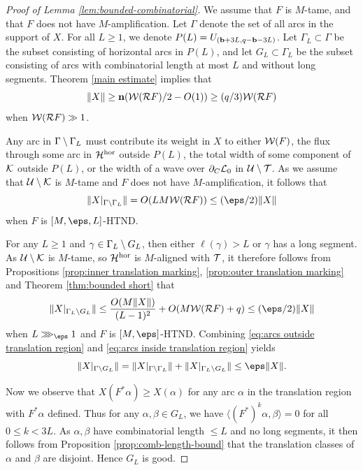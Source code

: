 \documentclass[12pt]{amsart}
\begin{document}
\begin{proof}[Proof of Lemma \ref{lem:bounded-combinatorial}]
	We assume that $F$ is $M$-tame, and that $F$ does not have $M$-amplification.	
	Let $\Gamma$ denote the set of all arcs in the support of $X$. For all $L\geq 1$, we denote $P(L)= U_{(\mathbf b+3L, q-\mathbf b-3L)}$. Let $\Gamma_L\subset \Gamma$ be the subset consisting of horizontal arcs in $P(L)$, and let  $G_L\subset \Gamma_L$ be the subset consisting of arcs with combinatorial length at most $L$
	and without long segments. Theorem \ref{main estimate} implies that 
	$$\|X\|\geq \mathbf{n} (\mathcal W(\mathcal R F)/2-O(1))\geq (q/3)\mathcal W(\mathcal R F)$$
	when $\mathcal W(\mathcal R F)\gg 1$.
	
	
	Any arc in $\Gamma\setminus \Gamma_L$ must contribute its weight in $X$ to either $\mathcal W(F)$, the flux through some arc in  $\mathcal H^{\mathrm{hor}}$ outside $P(L)$, the total width of some component of $\mathcal K$ outside $P(L)$, or the width of a wave over $\partial_C\mathcal L_0$ in $\mathcal U\setminus \mathcal T$. As we assume that $\mathcal U\setminus \mathcal K$ is $M$-tame and $F$ does not have $M$-amplification, it follows that
	\begin{equation}\label{eq:arcs outside translation region}
		\|X|_{\Gamma\sm \Gamma_L}\|  = 
		O(L M \WW(\RR F))\leq (\eps/2)\|X\|
	\end{equation}
	when $F$ is $[M, \eps, L]$-HTND.
	
	
	For any $L\geq 1$ and $\gamma\in \Gamma_L\setminus G_L$, 
	then either $\ell(\gamma)> L$ or $\gamma$ has a long segment. 
	As $\mathcal U\setminus \mathcal K$ is $M$-tame, so $\mathcal H^{\mathrm{hor}}$ is $M$-aligned with $\mathcal T$, it therefore follows from 
	Propositions \ref{prop:inner translation marking}, \ref{prop:outer translation marking} and Theorem \ref{thm:bounded short} 
	that 
	\begin{equation}\label{eq:arcs inside translation region}
		\|X|_{\Gamma_L\sm G_L}\|\leq \frac{O(M\|X\|)}{(L-1)^2}+ O(M\WW(\RR F)+q)\leq (\eps/2)\|X\|
	\end{equation}
	when $L\largegiven{\eps}$ and $F$ is $[M, \eps]$-HTND.
	Combining \eqref{eq:arcs outside translation region} and \eqref{eq:arcs inside translation region} yields 
	$$\|X|_{\Gamma\sm G_L}\|= \|X|_{\Gamma\sm \Gamma_L}\|+ \|X|_{\Gamma_L\sm G_L}\|\leq \eps\|X\|.$$
	
	Now we observe that $X(F^*\alpha)\geq X(\alpha)$ for any arc $\alpha$ in the translation region with $F^*\alpha$ defined.
	Thus for any $\alpha, \beta\in G_L$, we have $\langle (F^*)^k\alpha, \beta\rangle = 0$ for all $0\leq k < 3L$. 
	As $\alpha, \beta$ have combinatorial length $\leq L$ and no long segments, it then follows from Proposition \ref{prop:comb-length-bound} 
	that the translation classes of $\alpha$ and $\beta$ are disjoint. Hence $G_L$ is good.
\end{proof}
\end{document}
